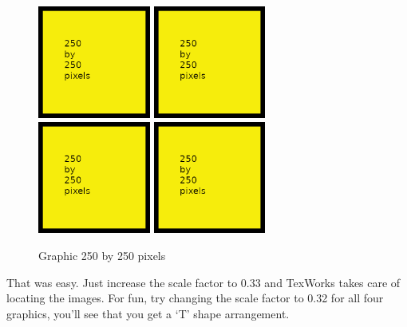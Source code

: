 \begin{figure}[H]
\centering
\includegraphics[width=0.33\textwidth]{250x250}
\includegraphics[width=0.33\textwidth]{250x250}
\includegraphics[width=0.33\textwidth]{250x250}
\includegraphics[width=0.33\textwidth]{250x250}
\caption{Graphic 250 by 250 pixels}\label{fg:250x250-5}
\end{figure}

That was easy.  Just increase the scale factor to 0.33 and TexWorks takes care of locating the images.  For fun, try changing the scale factor to 0.32 for all four graphics, you'll see that you get a `T' shape arrangement.\\

